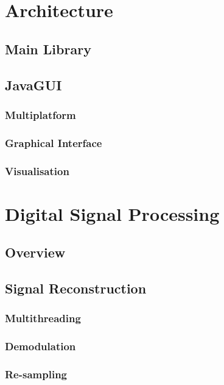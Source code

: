 \documentclass[a4paper,12pt,twoside,openright]{report}
\begin{document}
\section{Architecture}

\subsection{Main Library}

\subsection{JavaGUI}

\subsubsection{Multiplatform}

\subsubsection{Graphical Interface}

\subsubsection{Visualisation}

\section{Digital Signal Processing}

\subsection{Overview}

\subsection{Signal Reconstruction}

\subsubsection{Multithreading}

\subsubsection{Demodulation}

\subsubsection{Re-sampling}
\end{document}
